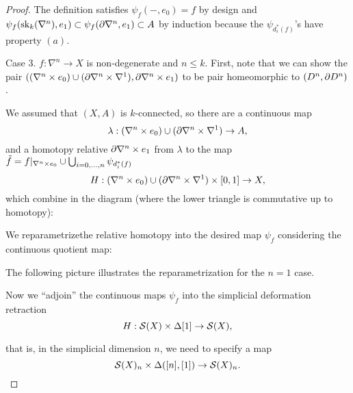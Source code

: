 \begin{proof}
The definition satisfies $\psi_f(-,e_0)=f$ by design and $\psi_f(\sk_k(\nabla^n),e_1)\subset\psi_f(\de\nabla^n,e_1)\subset A$ by induction because the $\psi_{d_i^*(f)}$'s have property $(a)$.

Case 3. $f:\nabla^n\to X$ is non-degenerate and $n\leq k$. First, note that we can show the pair $((\nabla^n\times e_0)\cup(\de\nabla^n\times\nabla^1), \de\nabla^n\times e_1)$ to be pair homeomorphic to $(D^n,\de D^n)$.

We assumed that $(X,A)$ is $k$-connected, so there are a continuous map
\[\lambda:(\nabla^n\times e_0)\cup(\de\nabla^n\times\nabla^1)\to A,\]
and a homotopy relative $\de\nabla^n\times e_1$ from $\lambda$ to the map $\til f=f|_{\ns\times e_0}\cup\bigcup_{i=0,\dots,n} \psi_{d_i^*(f)}$
\[H:(\nabla^n\times e_0)\cup(\de\nabla^n\times\nabla^1)\times[0,1]\to X,\]
which combine in the diagram (where the lower triangle is commutative up to homotopy):
\begin{center}
\end{center}

We reparametrizethe relative homotopy into the desired map $\psi_f$ considering the continuous quotient map:
\begin{center}
\end{center}

\smallskip

\bigskip

The following picture illustrates the reparametrization for the $n=1$ case.

\smallskip

\bigskip

Now we \enquote{adjoin} the continuous maps $\psi_f$ into the simplicial deformation retraction
\[H:\S(X)\times\Delta[1]\to \S(X),\]

that is, in the simplicial dimension $n$, we need to specify a map
\[\S(X)_n\times\Delta([n],[1])\to \S(X)_n.\]


\end{proof}
